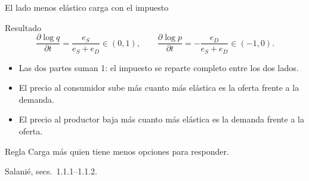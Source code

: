 \documentclass[aspectratio=169,11pt]{beamer}
\newcommand{\fuente}[1]{\par\vfill{\small\color{cGris}#1\par}}
\begin{document}
\begin{frame}{El lado menos elástico carga con el impuesto}
  \begin{block}{Resultado}
    \[
      \frac{\partial \log q}{\partial t} = \frac{e_S}{e_S+e_D}\in(0,1),
      \qquad
      \frac{\partial \log p}{\partial t} = -\frac{e_D}{e_S+e_D}\in(-1,0).
    \]
  \end{block}
  \pause
  \begin{itemize}
    \item Las dos partes suman 1: el impuesto se reparte completo entre los dos lados.
    \item El precio al consumidor sube más cuanto más elástica es la oferta frente a la demanda.
    \item El precio al productor baja más cuanto más elástica es la demanda frente a la oferta.
  \end{itemize}
  \pause
  \begin{alertblock}{Regla}
    Carga más quien tiene menos opciones para responder.
  \end{alertblock}
  \fuente{Salanié, secs.~1.1.1–1.1.2.}
\end{frame}
\end{document}
